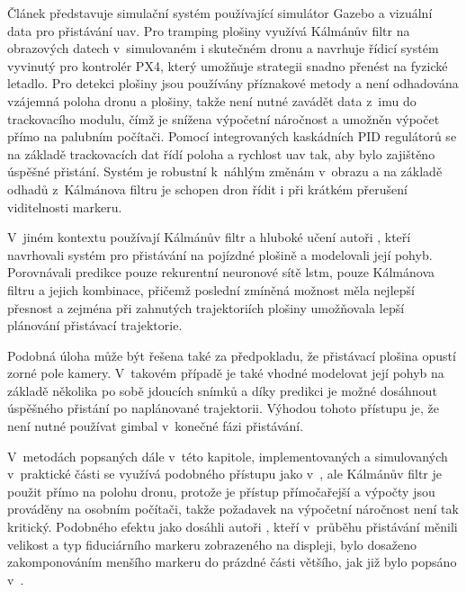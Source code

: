     Článek \cite{Saavedra2021} představuje simulační systém používající simulátor Gazebo a vizuální data pro přistávání \acrshort{uav}. Pro tramping plošiny využívá Kálmánův filtr na obrazových datech v~simulovaném i skutečném dronu a navrhuje řídicí systém vyvinutý pro kontrolér PX4, který umožňuje strategii snadno přenést na fyzické letadlo. Pro detekci plošiny jsou používány příznakové metody a není odhadována vzájemná poloha dronu a plošiny, takže není nutné zavádět data z~\acrshort{imu} do trackovacího modulu, čímž je snížena výpočetní náročnost a umožněn výpočet přímo na palubním počítači. Pomocí integrovaných kaskádních PID regulátorů se na základě trackovacích dat řídí poloha a rychlost \acrshort{uav} tak, aby bylo zajištěno úspěšné přistání. Systém je robustní k~náhlým změnám v~obrazu a na základě odhadů z~Kálmánova filtru je schopen dron řídit i při krátkém přerušení viditelnosti markeru.

    V~jiném kontextu používají Kálmánův filtr a hluboké učení autoři \cite{Luo2022}, kteří navrhovali systém pro přistávání na pojízdné plošině a modelovali její pohyb. Porovnávali predikce pouze rekurentní neuronové sítě \acrshort{lstm}, pouze Kálmánova filtru a jejich kombinace, přičemž poslední zmíněná možnost měla nejlepší přesnost a zejména při zahnutých trajektoriích plošiny umožňovala lepší plánování přistávací trajektorie.

    Podobná úloha může být řešena také za předpokladu, že přistávací plošina opustí zorné pole kamery. V~takovém případě je také vhodné modelovat její pohyb na základě několika po sobě jdoucích snímků a díky predikci je možné dosáhnout úspěšného přistání po naplánované trajektorii. Výhodou tohoto přístupu je, že není nutné používat gimbal v~konečné fázi přistávání. \cite{Acuna2018}

    V~metodách popsaných dále v~této kapitole, implementovaných a simulovaných v~praktické části se využívá podobného přístupu jako v~\cite{Saavedra2021}, ale Kálmánův filtr je použit přímo na polohu dronu, protože je přístup přímočařejší a výpočty jsou prováděny na osobním počítači, takže požadavek na výpočetní náročnost není tak kritický. Podobného efektu jako dosáhli autoři \cite{Acuna2017}, kteří v~průběhu přistávání měnili velikost a typ fiduciárního markeru zobrazeného na displeji, bylo dosaženo zakomponováním menšího markeru do prázdné části většího, jak již bylo popsáno v~.

